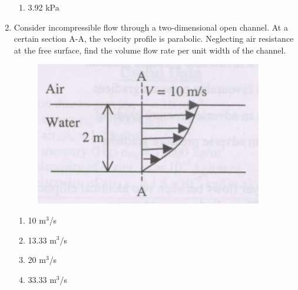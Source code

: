 \documentclass[journal]{IEEEtran}
\begin{document}
\begin{enumerate}
\begin{enumerate}
    \item 3.92 kPa \\
\end{enumerate}
\item Consider incompressible flow through a two-dimensional open channel. At a certain section A-A, the velocity profile is parabolic. Neglecting air resistance at the free surface, find the volume flow rate per unit width of the channel.
 \begin{figure}[h!]
	    \centering
	    \includegraphics[width=0.5\linewidth]{figs/Q12.png}
	      \end{figure}
 \begin{enumerate}
    \item 10 $\text{m}^3$/s
    \item 13.33 $\text{m}^3$/s
    \item 20 $\text{m}^3$/s
    \item 33.33 $\text{m}^3$/s \\
\end{enumerate}
			 \end{enumerate}
			 
\end{document}
